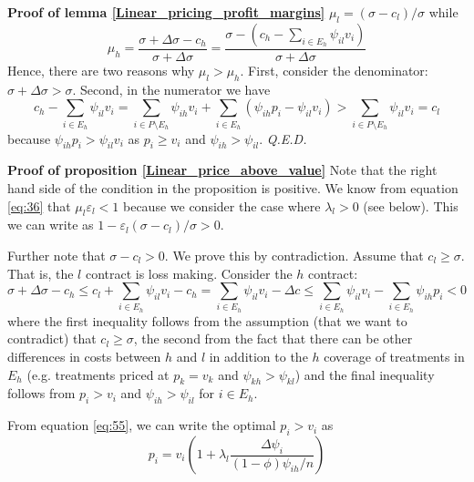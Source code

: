 \documentclass[12pt,english,a4paper]{article}
\newcommand{\qed}{\hspace*{\fill} {\em Q.E.D.}}
\begin{document}
\textbf{Proof of lemma \ref{Linear_pricing_profit_margins}}
\(\mu_l = (\sigma-c_l)/\sigma\) while
\begin{equation}
\label{eq:59}
\mu_h = \frac{\sigma+\Delta\sigma - c_h}{\sigma+\Delta\sigma}=\frac{\sigma-(c_h-\sum_{i \in E_h} \psi_{il} v_i)}{\sigma+\Delta\sigma}
\end{equation}
Hence, there are two reasons why \(\mu_l > \mu_h\). First, consider the denominator: \(\sigma+\Delta\sigma>\sigma\). Second, in the numerator we have
\begin{equation}
\label{eq:67}
c_h-\sum_{i \in E_h} \psi_{il} v_i = \sum_{i \in P \setminus E_h} \psi_{ih}v_i + \sum_{i \in E_h} (\psi_{ih}p_i-\psi_{il}v_i) > \sum_{i \in P \setminus E_h} \psi_{il} v_i = c_l
\end{equation}
because \(\psi_{ih}p_i > \psi_{il}v_i\) as \(p_i \geq v_i\) and \(\psi_{ih}>\psi_{il}\). 
 \qed

\textbf{Proof of proposition \ref{Linear_price_above_value}}
Note that the right hand side of the condition in the proposition is positive. We know from equation \eqref{eq:36} that \(\mu_l \varepsilon_l<1\) because we consider the case where \(\lambda_l > 0\) (see below). This we can write as \(1-\varepsilon_l (\sigma-c_l)/\sigma >0\).

Further note that \(\sigma-c_l >0\). We prove this by contradiction. Assume that \(c_l \geq \sigma\). That is, the \(l\) contract is loss making. Consider the \(h\) contract:
\begin{equation}
\label{eq:46}
\sigma+\Delta \sigma - c_h \leq c_l + \sum_{i \in E_h} \psi_{il} v_i - c_h =  \sum_{i \in E_h} \psi_{il} v_i - \Delta c \leq \sum_{i \in E_h} \psi_{il} v_i - \sum_{i \in E_h} \psi_{ih} p_i < 0
\end{equation}
where the first inequality follows from the assumption (that we want to contradict) that \(c_l \geq \sigma\), the second from the fact that there can be other differences in costs between \(h\) and \(l\) in addition to the \(h\) coverage of treatments in \(E_h\) (e.g. treatments priced at \(p_k=v_k\) and \(\psi_{kh}>\psi_{kl}\)) and the final inequality follows from \(p_i>v_i\) and \(\psi_{ih} > \psi_{il}\) for \(i \in E_h\).

From equation \eqref{eq:55}, we can write the optimal \(p_i>v_i\) as
\begin{equation}
\label{eq:60}
p_i = v_i \left( 1+ \lambda_l \frac{\Delta\psi_i}{(1-\phi)\psi_{ih}/n} \right)
\end{equation}
\end{document}
